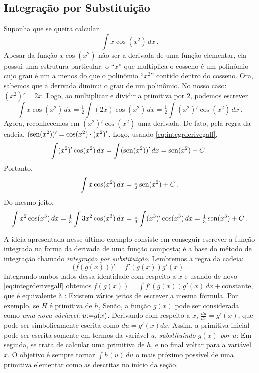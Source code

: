 \subsection{Integração por Substituição}\label{Sec:MetodoSubstit}
\begin{ex}
Suponha que se queira calcular $$\int x\cos (x^2)\,dx\,.$$
Apesar da função $x\cos (x^2)$ não ser a derivada de uma função elementar,
ela possui uma estrutura particular: o ``$x$'' que multiplica o cosseno é um
polinômio cujo grau é um a menos do que o polinômio ``$x^2$'' contido dentro do
cosseno. Ora, sabemos que a derivada diminui o grau de um polinômio. No nosso
caso: $(x^2)'=2x$. 
Logo, ao multiplicar e dividir a primitiva por $2$, podemos escrever
$$\int x\cos (x^2)\,dx=\tfrac12\int (2x)\cos (x^2)\,dx
=\tfrac12\int (x^2)'\cos (x^2)\,dx\,.$$
Agora, reconhecemos em $(x^2)'\cos (x^2)$ uma derivada. De fato, pela regra da
cadeia, $(\operatorname{sen} (x^2))'=\cos(x^2)\cdot (x^2)'$. Logo, usando
\eqref{eq:integrderivegalf},
$$
\int (x^2)'\cos (x^2)\,dx=\int (\operatorname{sen} (x^2))'\,dx=
\operatorname{sen}(x^2)+C\,.
$$
Portanto,
$$\int x\cos (x^2)\,dx=\tfrac12\operatorname{sen}(x^2)+C\,.$$
Do mesmo jeito, 
$$\int x^2 \cos (x^3)\,dx=\tfrac13\int 3x^2 \cos (x^3)\,dx=
\tfrac13\int (x^3)' \cos (x^3)\,dx= \tfrac13\operatorname{sen} (x^3)+C\,.$$
\end{ex}

A ideia apresentada nesse último exemplo consiste em conseguir 
escrever a função integrada na forma da derivada 
de uma função composta; é a base do método de integração chamado
\emph{integração por substituição}.
Lembremos a regra da cadeia:
$$\bigl(f(g(x))\bigr)'=f'(g(x))g'(x)\,.$$
Integrando ambos lados dessa identidade com respeito a $x$ e usando de
novo \eqref{eq:integrderivegalf} obtemos
$f(g(x))=\int f'(g(x))g'(x)\,dx+\text{constante}$, que é equivalente à
:
Existem vários jeitos de escrever a mesma fórmula. Por exemplo, se $H$ é
primitiva de $h$,
Senão, a função $g(x)$ pode ser considerada como
\emph{uma nova váriavel}: $u{:=} g(x)$. 
Derivando com respeito a $x$,
$\frac{du}{dx}=g'(x)$, que pode ser simbolicamente escrita como $du=g'(x)dx$.
Assim, a primitiva inicial pode ser escrita
somente em termos da variável $u$, \emph{substituindo $g(x)$ por $u$}:
Em seguida, se trata de calcular uma primitiva de $h$, e no final voltar para a
variável $x$. O objetivo é sempre tornar $\int h(u)\,du$ o mais próximo possível
de uma primitiva elementar como as descritas no início da seção.

